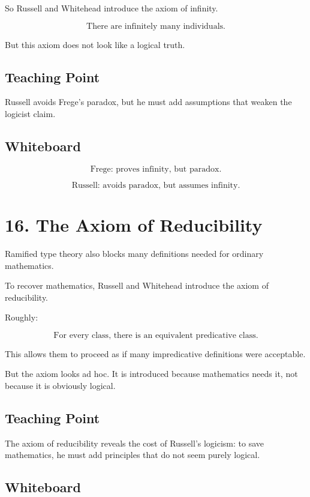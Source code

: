 \documentclass[11pt]{article}
\begin{document}
So Russell and Whitehead introduce the axiom of infinity.

\[
\boxed{
\text{There are infinitely many individuals.}
}
\]

But this axiom does not look like a logical truth.

\subsection*{Teaching Point}

Russell avoids Frege's paradox, but he must add assumptions that weaken the logicist
claim.

\subsection*{Whiteboard}

\[
\text{Frege: proves infinity, but paradox.}
\]

\[
\text{Russell: avoids paradox, but assumes infinity.}
\]

\section*{16. The Axiom of Reducibility}

Ramified type theory also blocks many definitions needed for ordinary mathematics.

To recover mathematics, Russell and Whitehead introduce the axiom of reducibility.

Roughly:

\[
\boxed{
\text{For every class, there is an equivalent predicative class.}
}
\]

This allows them to proceed as if many impredicative definitions were acceptable.

But the axiom looks ad hoc. It is introduced because mathematics needs it, not because it
is obviously logical.

\subsection*{Teaching Point}

The axiom of reducibility reveals the cost of Russell's logicism: to save mathematics, he
must add principles that do not seem purely logical.

\subsection*{Whiteboard}
\end{document}
